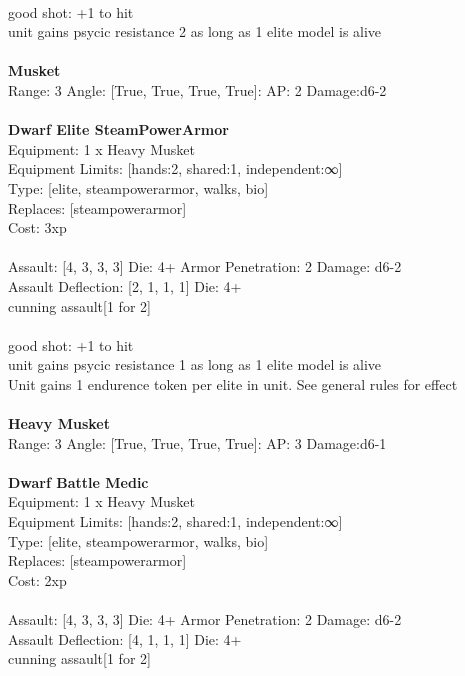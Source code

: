 \ \\
good shot: +1 to hit\\ 
unit gains psycic resistance 2 as long as 1 elite model is alive\\ 

\ \\
{\bf Musket } \\



Range: 3  Angle: [True, True, True, True]: AP: 2 Damage:d6-2 \\




 
\ \\

{\bf Dwarf Elite SteamPowerArmor } \\
Equipment: 1 x Heavy Musket \\
Equipment Limits: [hands:2, shared:1, independent:∞] \\
Type: [elite, steampowerarmor, walks, bio] \\
Replaces: [steampowerarmor] \\
Cost: 3xp\\
\ \\
Assault: [4, 3, 3, 3] Die: 4+ Armor Penetration: 2 Damage: d6-2 \\
Assault Deflection: [2, 1, 1, 1] Die: 4+\\
\indent cunning assault[1 for 2]\\ 
 
\ \\
good shot: +1 to hit\\ 
unit gains psycic resistance 1 as long as 1 elite model is alive\\ 
Unit gains 1 endurence token per elite in unit. See general rules for effect\\ 

\ \\
{\bf Heavy Musket } \\



Range: 3  Angle: [True, True, True, True]: AP: 3 Damage:d6-1 \\




 
\ \\

{\bf Dwarf Battle Medic } \\
Equipment: 1 x Heavy Musket \\
Equipment Limits: [hands:2, shared:1, independent:∞] \\
Type: [elite, steampowerarmor, walks, bio] \\
Replaces: [steampowerarmor] \\
Cost: 2xp\\
\ \\
Assault: [4, 3, 3, 3] Die: 4+ Armor Penetration: 2 Damage: d6-2 \\
Assault Deflection: [4, 1, 1, 1] Die: 4+\\
\indent cunning assault[1 for 2]\\ 
 
